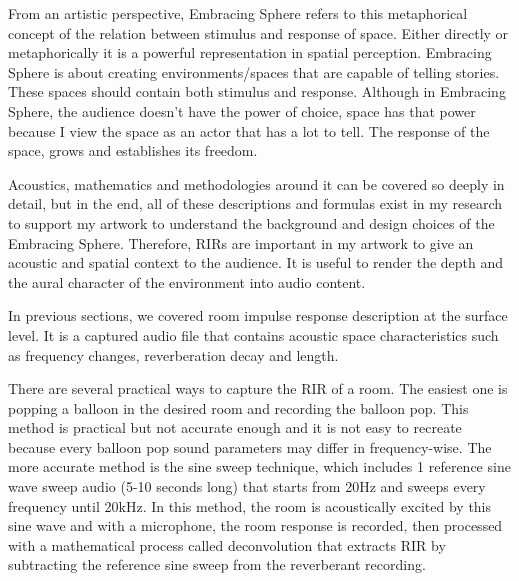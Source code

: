             From an artistic perspective, Embracing Sphere refers to this metaphorical concept of the relation between stimulus and response of space. Either directly or metaphorically it is a powerful representation in spatial perception. Embracing Sphere is about creating environments/spaces that are capable of telling stories. These spaces should contain both stimulus and response. Although in Embracing Sphere, the audience doesn't have the power of choice, space has that power because I view the space as an actor that has a lot to tell. The response of the space, grows and establishes its freedom.\par

            Acoustics, mathematics and methodologies around it can be covered so deeply in detail, but in the end, all of these descriptions and formulas exist in my research to support my artwork to understand the background and design choices of the Embracing Sphere. Therefore, RIRs are important in my artwork to give an acoustic and spatial context to the audience. It is useful to render the depth and the aural character of the environment into audio content.\par

            In previous sections, we covered room impulse response description at the surface level. It is a captured audio file that contains acoustic space characteristics such as frequency changes, reverberation decay and length.\par

            There are several practical ways to capture the RIR of a room. The easiest one is popping a balloon in the desired room and recording the balloon pop. This method is practical but not accurate enough and it is not easy to recreate because every balloon pop sound parameters may differ in frequency-wise\cite{RIR_Swept-Sine_Technique}. The more accurate method is the sine sweep technique, which includes 1 reference sine wave sweep audio (5-10 seconds long) that starts from 20Hz and sweeps every frequency until 20kHz\cite{Auditory_Perception_of_Sound_Sources}. In this method, the room is acoustically excited by this sine wave and with a microphone, the room response is recorded, then processed with a mathematical process called deconvolution that extracts RIR by subtracting the reference sine sweep from the reverberant recording.\par

